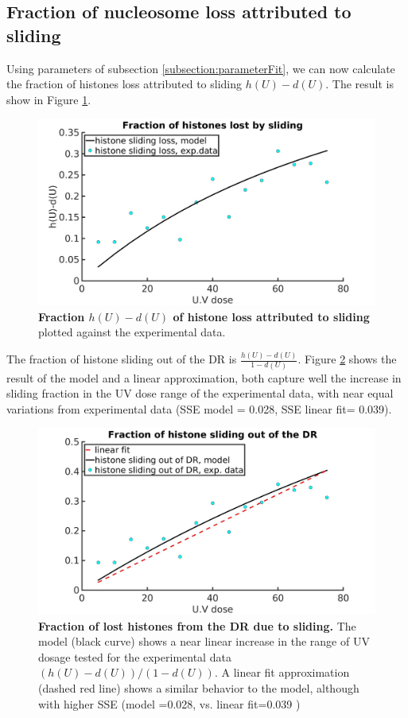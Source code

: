 \documentclass[12pt]{article}
\begin{document}
\subsection{Fraction of nucleosome loss attributed to sliding}\label{subsection:lossAttributedToSliding}
Using parameters of subsection \ref{subsection:parameterFit}, we can now calculate the fraction of histones loss attributed to sliding $h(U)-d(U)$. The result is show in Figure \ref{fig:hVsUVDoseModelFit01}.
\begin{figure}[http!]
\centering
\includegraphics[width=0.5\linewidth, height=0.3\textheight]{hVsUVDoseModelFit}
\caption{\textbf{Fraction $h(U)-d(U)$ of histone loss attributed to sliding} plotted against the experimental data.}
\label{fig:hVsUVDoseModelFit01}
\end{figure}
The fraction of histone sliding out of the DR is $\frac{h(U)-d(U)}{1-d(U)}$. Figure \ref{fig:histoneSlideFromDamageRegionComparision} shows the result of the model and a linear approximation, both capture well the increase in sliding fraction in the UV dose range of the experimental data, with near equal variations from experimental data (SSE model = 0.028, SSE linear fit= 0.039).
\begin{figure}[http!]
	\centering
	\includegraphics[width=0.7\linewidth, height=0.3\textheight]{histoneSlideFromDamageRegionComparision}
	\caption{\textbf{Fraction of lost histones from the DR due to sliding.} The model (black curve) shows a near linear increase in the range of UV dosage tested for the experimental data $(h(U)-d(U))/(1-d(U))$. A linear fit approximation (dashed red line) shows a similar behavior to the model, although with higher SSE (model =0.028, vs. linear fit=0.039 ) }
	\label{fig:histoneSlideFromDamageRegionComparision}
\end{figure}
\end{document}
